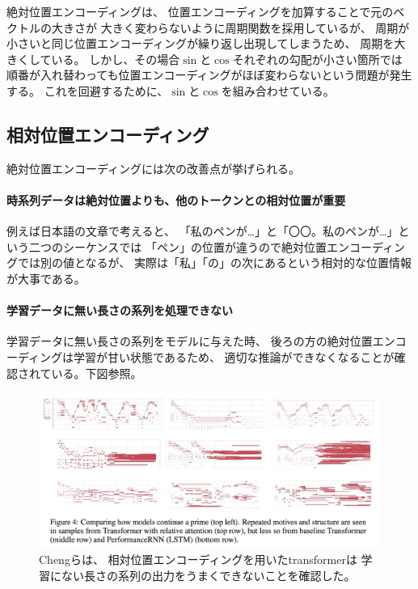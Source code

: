 \documentclass{jsarticle}
\begin{document}
        絶対位置エンコーディングは、
        位置エンコーディングを加算することで元のベクトルの大きさが
        大きく変わらないように周期関数を採用しているが、
        周期が小さいと同じ位置エンコーディングが繰り返し出現してしまうため、
        周期を大きくしている。
        しかし、その場合$\sin$と$\cos$それぞれの勾配が小さい箇所では
        順番が入れ替わっても位置エンコーディングがほぼ変わらないという問題が発生する。
        これを回避するために、$\sin$と$\cos$を組み合わせている。

    \subsection{相対位置エンコーディング}
        絶対位置エンコーディングには次の改善点が挙げられる。
        \paragraph{時系列データは絶対位置よりも、他のトークンとの相対位置が重要}
            例えば日本語の文章で考えると、
            「私のペンが…」と「〇〇。私のペンが…」という二つのシーケンスでは
            「ペン」の位置が違うので絶対位置エンコーディングでは別の値となるが、
            実際は「私」「の」の次にあるという相対的な位置情報が大事である。
        \paragraph{学習データに無い長さの系列を処理できない}
            学習データに無い長さの系列をモデルに与えた時、
            後ろの方の絶対位置エンコーディングは学習が甘い状態であるため、
            適切な推論ができなくなることが確認されている。下図参照。
            \begin{figure}[h]
                \centering
                \includegraphics[width=.8\linewidth]{catastrophie.png}
                \caption{
                    Chengら\cite{catastrophie}は、
                    相対位置エンコーディングを用いたtransformerは
                    学習にない長さの系列の出力をうまくできないことを確認した。
                }
            \end{figure}
\end{document}
